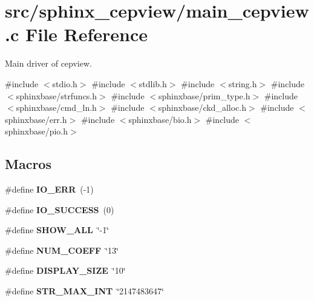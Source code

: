 \section{src/sphinx\+\_\+cepview/main\+\_\+cepview.c File Reference}
\label{main__cepview_8c}


Main driver of cepview.  


{\ttfamily \#include $<$stdio.\+h$>$}\newline
{\ttfamily \#include $<$stdlib.\+h$>$}\newline
{\ttfamily \#include $<$string.\+h$>$}\newline
{\ttfamily \#include $<$sphinxbase/strfuncs.\+h$>$}\newline
{\ttfamily \#include $<$sphinxbase/prim\+\_\+type.\+h$>$}\newline
{\ttfamily \#include $<$sphinxbase/cmd\+\_\+ln.\+h$>$}\newline
{\ttfamily \#include $<$sphinxbase/ckd\+\_\+alloc.\+h$>$}\newline
{\ttfamily \#include $<$sphinxbase/err.\+h$>$}\newline
{\ttfamily \#include $<$sphinxbase/bio.\+h$>$}\newline
{\ttfamily \#include $<$sphinxbase/pio.\+h$>$}\newline
\subsection*{Macros}
\begin{DoxyCompactItemize}
\item 
\mbox{\label{main__cepview_8c_a2f594e19531c324dd254ba0cc712044d}} 
\#define {\bfseries I\+O\+\_\+\+E\+RR}~(-\/1)
\item 
\mbox{\label{main__cepview_8c_adad481c8f8fcb43725ccb11be5c690f4}} 
\#define {\bfseries I\+O\+\_\+\+S\+U\+C\+C\+E\+SS}~(0)
\item 
\mbox{\label{main__cepview_8c_aaddcd19f0e123722b857ec68d1d3e156}} 
\#define {\bfseries S\+H\+O\+W\+\_\+\+A\+LL}~\char`\"{}-\/1\char`\"{}
\item 
\mbox{\label{main__cepview_8c_a56e7544225bcd9da32fa61cde6e6f523}} 
\#define {\bfseries N\+U\+M\+\_\+\+C\+O\+E\+FF}~\char`\"{}13\char`\"{}
\item 
\mbox{\label{main__cepview_8c_a035c0b93babde37c8919064af8b67928}} 
\#define {\bfseries D\+I\+S\+P\+L\+A\+Y\+\_\+\+S\+I\+ZE}~\char`\"{}10\char`\"{}
\item 
\mbox{\label{main__cepview_8c_a01f1f09f8562ef6971aa38c4f8f32954}} 
\#define {\bfseries S\+T\+R\+\_\+\+M\+A\+X\+\_\+\+I\+NT}~\char`\"{}2147483647\char`\"{}
\end{DoxyCompactItemize}
